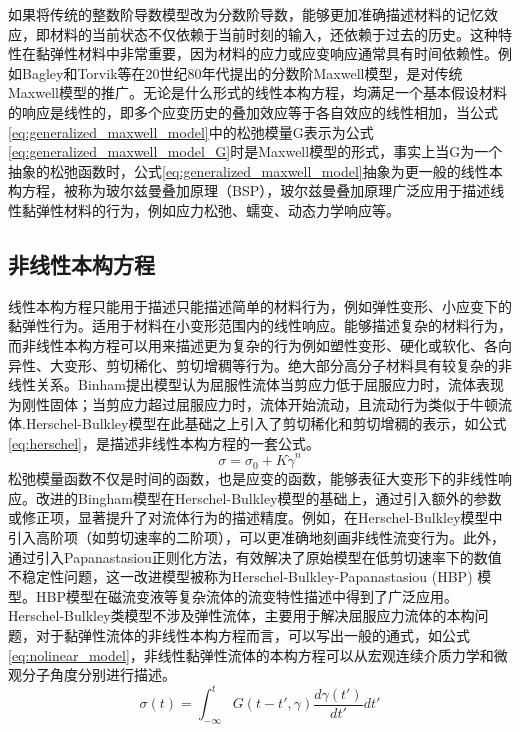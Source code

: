 如果将传统的整数阶导数模型改为分数阶导数，能够更加准确描述材料的记忆效应，即材料的当前状态不仅依赖于当前时刻的输入，还依赖于过去的历史。这种特性在黏弹性材料中非常重要，因为材料的应力或应变响应通常具有时间依赖性。例如Bagley和Torvik等在20世纪80年代提出的分数阶Maxwell模型，是对传统Maxwell模型的推广。无论是什么形式的线性本构方程，均满足一个基本假设材料的响应是线性的，即多个应变历史的叠加效应等于各自效应的线性相加，当公式\eqref{eq:generalized_maxwell_model}中的松弛模量G表示为公式\eqref{eq:generalized_maxwell_model_G}时是Maxwell模型的形式，事实上当G为一个抽象的松弛函数时，公式\eqref{eq:generalized_maxwell_model}抽象为更一般的线性本构方程，被称为玻尔兹曼叠加原理（BSP），玻尔兹曼叠加原理广泛应用于描述线性黏弹性材料的行为，例如应力松弛、蠕变、动态力学响应等。
\subsection{非线性本构方程}
线性本构方程只能用于描述只能描述简单的材料行为，例如弹性变形、小应变下的黏弹性行为。适用于材料在小变形范围内的线性响应。能够描述复杂的材料行为，而非线性本构方程可以用来描述更为复杂的行为例如塑性变形、硬化或软化、各向异性、大变形、剪切稀化、剪切增稠等行为。绝大部分高分子材料具有较复杂的非线性关系。Binham提出模型认为屈服性流体当剪应力低于屈服应力时，流体表现为刚性固体；当剪应力超过屈服应力时，流体开始流动，且流动行为类似于牛顿流体.Herschel-Bulkley模型在此基础之上引入了剪切稀化和剪切增稠的表示，如公式\eqref{eq:herschel}，是描述非线性本构方程的一套公式。
\begin{equation}
	\sigma=\sigma_0+K\dot{\gamma}^n \label{eq:herschel}
\end{equation}
松弛模量函数不仅是时间的函数，也是应变的函数，能够表征大变形下的非线性响应。改进的Bingham模型在Herschel-Bulkley模型的基础上，通过引入额外的参数或修正项，显著提升了对流体行为的描述精度。例如，在Herschel-Bulkley模型中引入高阶项（如剪切速率的二阶项），可以更准确地刻画非线性流变行为。此外，通过引入Papanastasiou正则化方法，有效解决了原始模型在低剪切速率下的数值不稳定性问题，这一改进模型被称为Herschel-Bulkley-Papanastasiou (HBP) 模型。HBP模型在磁流变液等复杂流体的流变特性描述中得到了广泛应用。
Herschel-Bulkley类模型不涉及弹性流体，主要用于解决屈服应力流体的本构问题，对于黏弹性流体的非线性本构方程而言，可以写出一般的通式，如公式\eqref{eq:nolinear_model}，非线性黏弹性流体的本构方程可以从宏观连续介质力学和微观分子角度分别进行描述。
\begin{equation}
	\sigma(t) = \int_{-\infty}^{t} G(t-t',\gamma) \frac{d\gamma(t')}{dt'} dt' \label{eq:nolinear_model}
\end{equation}

